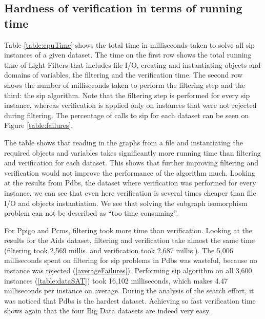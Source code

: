 \documentclass{l4proj}
\begin{document}
\subsection{Hardness of verification in terms of running time}
\label{subsec:hardnessVerifcTime}

Table \ref{table:cpuTime} shows the total time in milliseconds taken to solve all \gls{sip} instances of a given dataset. The time on the first row shows the total running time of Light Filters that includes file I/O, creating and instantiating objects and domains of variables, the filtering and the verification time. The second row shows the number of milliseconds taken to perform the filtering step and the third: the \gls{sip} algorithm. Note that the filtering step is performed for every sip instance, whereas verification is applied only on instances that were not rejected during filtering. The percentage of calls to sip for each dataset can be seen on Figure \ref{table:failures}.

The table shows that reading in the graphs from a file and instantiating the required objects and variables takes significantly more running time than filtering and verification for each dataset. 
This shows that further improving filtering and verification would not improve the performance of the algorithm much. Looking at the results from Pdbs, the dataset where verification was performed for every instance, we can see that even here verification is several times cheaper than file I/O and objects instantiation. We see that solving the subgraph isomorphism problem can not be described as ``too time consuming''.

For Ppigo and Pcms, filtering took more time than verification. Looking at the results for the Aids dataset, filtering and verification take almost the same time (filtering took 2,569 millis. and verification took 2,687 millis.). The 5,006 milliseconds spent on filtering for \gls{sip} problems in Pdbs was wasteful, because no instance was rejected (\ref{averageFailures}). Performing \gls{sip} algorithm on all 3,600 instances (\ref{table:dataSAT}) took 16,102 milliseconds, which makes 4.47 milliseconds per instance on average. During the analysis of the search effort, it was noticed that Pdbs is the hardest dataset. Achieving so fast verification time shows again that the four Big Data datasets are indeed very easy.
\end{document}
